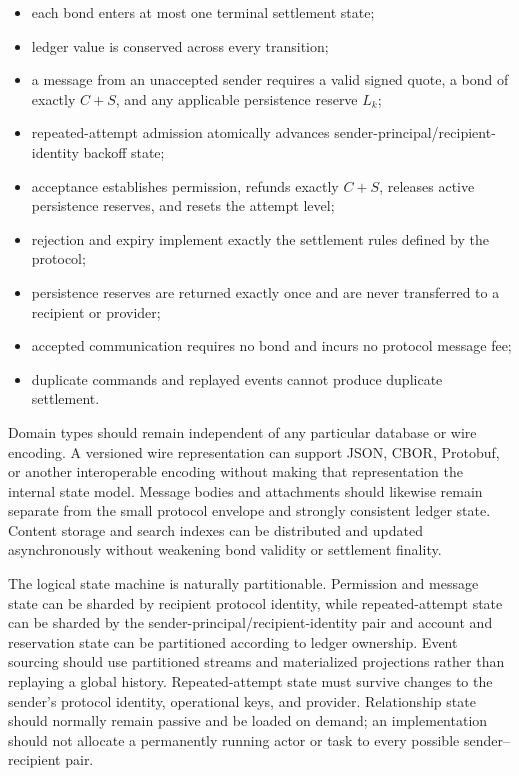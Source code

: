 \documentclass[11pt]{article}
\begin{document}
\begin{itemize}[leftmargin=2em]
    \item each bond enters at most one terminal settlement state;
    \item ledger value is conserved across every transition;
    \item a message from an unaccepted sender requires a valid signed quote, a bond of exactly $C+S$, and any applicable persistence reserve $L_k$;
    \item repeated-attempt admission atomically advances sender-principal/recipient-identity backoff state;
    \item acceptance establishes permission, refunds exactly $C+S$, releases active persistence reserves, and resets the attempt level;
    \item rejection and expiry implement exactly the settlement rules defined by the protocol;
    \item persistence reserves are returned exactly once and are never transferred to a recipient or provider;
    \item accepted communication requires no bond and incurs no protocol message fee;
    \item duplicate commands and replayed events cannot produce duplicate settlement.
\end{itemize}

Domain types should remain independent of any particular database or wire encoding. A versioned wire representation can support JSON, CBOR, Protobuf, or another interoperable encoding without making that representation the internal state model. Message bodies and attachments should likewise remain separate from the small protocol envelope and strongly consistent ledger state. Content storage and search indexes can be distributed and updated asynchronously without weakening bond validity or settlement finality.

The logical state machine is naturally partitionable. Permission and message state can be sharded by recipient protocol identity, while repeated-attempt state can be sharded by the sender-principal/recipient-identity pair and account and reservation state can be partitioned according to ledger ownership. Event sourcing should use partitioned streams and materialized projections rather than replaying a global history. Repeated-attempt state must survive changes to the sender's protocol identity, operational keys, and provider. Relationship state should normally remain passive and be loaded on demand; an implementation should not allocate a permanently running actor or task to every possible sender--recipient pair.
\end{document}
